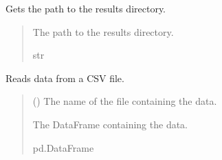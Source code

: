 \documentclass[letterpaper,10pt,english]{sphinxmanual}
\begin{document}
\begin{fulllineitems}

\begin{fulllineitems}
\label{\detokenize{modules:application.services.FileSystemService.FileSystemService.get_results_path}}
\pysigstartsignatures
{}
\pysigstopsignatures
\sphinxAtStartPar
Gets the path to the results directory.
\begin{quote}\begin{description}
\sphinxAtStartPar
The path to the results directory.

\sphinxAtStartPar
str

\end{description}\end{quote}

\end{fulllineitems}


\begin{fulllineitems}
\label{\detokenize{modules:application.services.FileSystemService.FileSystemService.read_dataFrom}}
\pysigstartsignatures
{}
\pysigstopsignatures
\sphinxAtStartPar
Reads data from a CSV file.
\begin{quote}\begin{description}
\sphinxAtStartPar
{} () \textendash{} The name of the file containing the data.

\sphinxAtStartPar
The DataFrame containing the data.

\sphinxAtStartPar
pd.DataFrame

\end{description}\end{quote}

\end{fulllineitems}


\end{fulllineitems}
\end{document}
